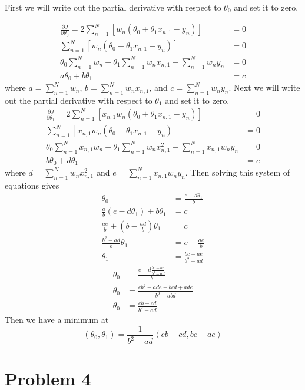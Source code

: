 \documentclass[12pt]{article}
\begin{document}
First we will write out the partial derivative with respect to \(\theta_0\) and set it to zero.

\begin{align*}
        \frac{\partial J}{\partial \theta_0}=2\sum_{n=1}^N \left[w_n(\theta_0+\theta_1x_{n,1}-y_n)\right]&=0\\
        \sum_{n=1}^N \left[w_n(\theta_0+\theta_1x_{n,1}-y_n)\right]&=0\\
        \theta_0\sum_{n=1}^N w_n + \theta_1\sum_{n=1}^N w_nx_{n,1} - \sum_{n=1}^N w_ny_n&=0\\
        a\theta_0 + b\theta_1 &= c
\end{align*}
where \(a=\sum_{n=1}^N w_n\), \(b=\sum_{n=1}^N w_nx_{n,1}\), and \(c=\sum_{n=1}^N w_ny_n\). Next we
will write out the partial derivative with respect to \(\theta_1\) and set it to zero.
\begin{align*}
        \frac{\partial J}{\partial \theta_1}=2\sum_{n=1}^N \left[x_{n,1}w_n(\theta_0+\theta_1x_{n,1}-y_n)\right]&=0\\
        \sum_{n=1}^N \left[x_{n,1}w_n(\theta_0+\theta_1x_{n,1}-y_n)\right]&=0\\
        \theta_0\sum_{n=1}^N x_{n,1}w_n + \theta_1\sum_{n=1}^N w_nx_{n,1}^2 - \sum_{n=1}^N x_{n,1}w_ny_n&=0\\
        b\theta_0 + d\theta_1 &= e
\end{align*}
where \(d=\sum_{n=1}^N w_nx_{n,1}^2\) and \(e=\sum_{n=1}^N x_{n,1}w_ny_n\). Then solving this system of equations gives
\begin{align*}
        \theta_0&=\frac{e-d\theta_1}{b}\\
        \frac{a}{b}(e-d\theta_1)+b\theta_1&=c\\
        \frac{ae}{b}+\left(b-\frac{ad}{b}\right)\theta_1&=c\\
        \frac{b^2-ad}{b}\theta_1&=c-\frac{ae}{b}\\
        \theta_1&=\frac{bc-ae}{b^2-ad}
\end{align*}
\begin{align*}
        \theta_0&=\frac{e-d\frac{bc-ae}{b^2-ad}}{b}\\
        \theta_0&=\frac{eb^2-ade-bcd+ade}{b^3-abd}\\
        \theta_0&=\frac{eb-cd}{b^2-ad}
\end{align*}
Then we have a minimum at
\[(\theta_0,\theta_1)=\frac{1}{b^2-ad}\left<eb-cd, bc-ae\right>\]

\section*{Problem 4}
\end{document}
